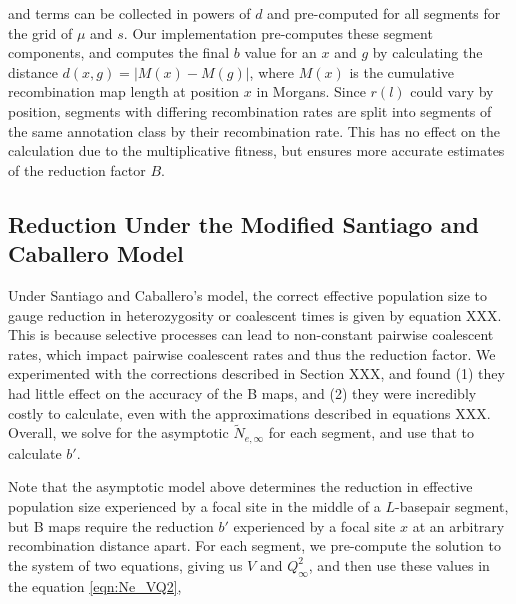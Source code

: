\documentclass[11pt]{article}
\begin{document}
and terms can be collected in powers of $d$ and pre-computed for all segments
for the grid of $\mu$ and $s$. Our implementation pre-computes these segment
components, and computes the final $b$ value for an $x$ and $g$ by calculating
the distance $d(x,g) = |M(x) - M(g)|$, where $M(x)$ is the cumulative
recombination map length at position $x$ in Morgans. Since $r(l)$ could vary by
position, segments with differing recombination rates are split into segments
of the same annotation class by their recombination rate. This has no effect on
the calculation due to the multiplicative fitness, but ensures more accurate
estimates of the reduction factor $B$.


\subsection{Reduction Under the Modified Santiago and Caballero Model}

Under Santiago and Caballero's model, the correct effective population size to
gauge reduction in heterozygosity or coalescent times is given by equation XXX.
This is because selective processes can lead to non-constant pairwise
coalescent rates, which impact pairwise coalescent rates and thus the reduction
factor. We experimented with the corrections described in Section XXX, and
found (1) they had little effect on the accuracy of the B maps, and (2) they
were incredibly costly to calculate, even with the approximations described in
equations XXX. Overall, we solve for the asymptotic $\widetilde{N}_{e,\infty}$
for each segment, and use that to calculate $b'$.

Note that the asymptotic model above determines the reduction in effective
population size experienced by a focal site in the middle of a $L$-basepair
segment, but B maps require the reduction $b'$ experienced by a focal site $x$
at an arbitrary recombination distance apart. For each segment, we pre-compute
the solution to the system of two equations, giving us $V$ and $Q_\infty^2$,
and then use these values in the equation \eqref{eqn:Ne_VQ2},
\end{document}
